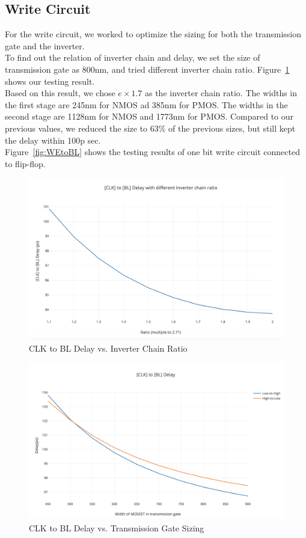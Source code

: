 \documentclass[10pt,letterpaper,onecolumn]{article}
\begin{document}
\subsection{Write Circuit}

For the write circuit, we worked to optimize the sizing for both the transmission gate and the inverter. \\
To find out the relation of inverter chain and delay, we set the size of transmission gate as 800nm, and tried different inverter chain ratio. Figure~\ref{fig:inverterChainRatio} shows our testing result. \\
Based on this result, we chose \(e \times 1.7\) as the inverter chain ratio. The widths in the first stage are 245nm for NMOS ad 385nm for PMOS. The widths in the second stage are 1128nm for NMOS and 1773nm for PMOS. Compared to our previous values, we reduced the size to 63\% of the previous sizes, but still kept the delay within 100p sec.\\
Figure~\ref{fig:WEtoBL} shows the testing results of one bit write circuit connected to flip-flop.\\

\begin{figure}[h!]
\centering
\includegraphics[clip,width=\columnwidth]{inverterChainRatio.png}
\caption{CLK to BL Delay vs. Inverter Chain Ratio}
\label{fig:inverterChainRatio}
\end{figure}

\begin{figure}[h!]
\centering
\includegraphics[clip,width=\columnwidth]{CLKtoBLDelayPlot.png}
\caption{CLK to BL Delay vs. Transmission Gate Sizing}
\label{fig:CLKtoBLPlot}
\end{figure}
\end{document}

